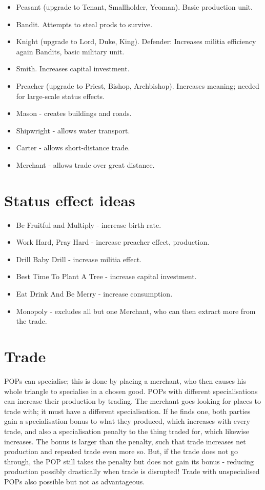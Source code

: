 \documentclass[12pt]{article}
\begin{document}
\begin{itemize}
\item Peasant (upgrade to Tenant, Smallholder, Yeoman). Basic
  production unit.
\item Bandit. Attempts to steal prods to survive.
\item Knight (upgrade to Lord, Duke, King). Defender: Increases
  militia efficiency again Bandits, basic military unit.
\item Smith. Increases capital investment.
\item Preacher (upgrade to Priest, Bishop, Archbishop). Increases
  meaning; needed for large-scale status effects.
\item Mason - creates buildings and roads.
\item Shipwright - allows water transport.
\item Carter - allows short-distance trade.
\item Merchant - allows trade over great distance.
\end{itemize}

\section{Status effect ideas}

\begin{itemize}
\item Be Fruitful and Multiply - increase birth rate.
\item Work Hard, Pray Hard - increase preacher effect, production. 
\item Drill Baby Drill - increase militia effect.
\item Best Time To Plant A Tree - increase capital investment.
\item Eat Drink And Be Merry - increase consumption.
\item Monopoly - excludes all but one Merchant, who can then extract
  more from the trade.
\end{itemize}

\section{Trade}

POPs can specialise; this is done by placing a merchant, who then
causes his whole triangle to specialise in a chosen good. POPs with
different specialisations can increase their production by trading. The
merchant goes looking for places to trade with; it must have a
different specialisation. If he finds one, both parties gain a
specialisation bonus to what they produced, which increases with every
trade, and also a specialisation penalty to the thing traded for,
which likewise increases. The bonus is larger than the penalty, such
that trade increases net production and repeated trade even more
so. But, if the trade does not go through, the POP still takes the
penalty but does not gain its bonus - reducing production possibly
drastically when trade is disrupted! Trade with unspecialised POPs
also possible but not as advantageous.
\end{document}
